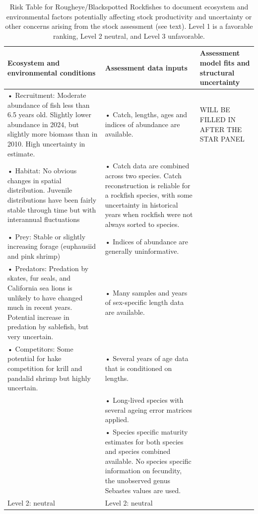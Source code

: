 \documentclass[
]{scrartcl}
\begin{document}
\newpage

\begingroup
\fontsize{9.0pt}{10.8pt}\selectfont

\begin{longtable}{>{\raggedright\arraybackslash}p{\dimexpr 150.00pt -2\tabcolsep-1.5\arrayrulewidth}>{\raggedright\arraybackslash}p{\dimexpr 150.00pt -2\tabcolsep-1.5\arrayrulewidth}>{\raggedright\arraybackslash}p{\dimexpr 150.00pt -2\tabcolsep-1.5\arrayrulewidth}}

\caption{\label{tbl-risk}Risk Table for Rougheye/Blackspotted Rockfishes
to document ecosystem and environmental factors potentially affecting
stock productivity and uncertainty or other concerns arising from the
stock assessment (see text). Level 1 is a favorable ranking, Level 2
neutral, and Level 3 unfavorable.}

\tabularnewline

\toprule
Ecosystem and environmental conditions & Assessment data inputs & Assessment model fits and structural uncertainty \\ 
\midrule\addlinespace[2.5pt]
• Recruitment: Moderate abundance of fish less than 6.5 years old.  Slightly lower abundance in 2024, but slightly more biomass than in 2010. High uncertainty in estimate.  & • Catch, lengths, ages and indices of abundance are available. & WILL BE FILLED IN AFTER THE STAR PANEL \\ 
• Habitat: No obvious changes in spatial distribution. Juvenile distributions have been fairly stable through time but with interannual fluctuations & • Catch data are combined across two species. Catch reconstruction is reliable for a rockfish species, with some uncertainty in historical years when rockfish were not always sorted to species. &  \\ 
• Prey:  Stable or slightly increasing forage (euphausiid and pink shrimp)  & • Indices of abundance are generally uninformative. &  \\ 
• Predators: Predation by skates, fur seals, and California sea lions is unlikely to have changed much in recent years. Potential increase in predation by sablefish, but very uncertain. & • Many samples and years of sex-specific length data are available. &  \\ 
• Competitors: Some potential for hake competition for krill and pandalid shrimp but highly uncertain. & • Several years of age data that is conditioned on lengths.  &  \\ 
 & • Long-lived species with several ageing error matrices applied. &  \\ 
 & • Species specific maturity estimates for both species and species combined available. No species specific information on fecundity, the unobserved genus Sebastes values are used. &  \\ 
Level 2: neutral  & Level 2: neutral  &  \\ 
\bottomrule

\end{longtable}
\end{document}
